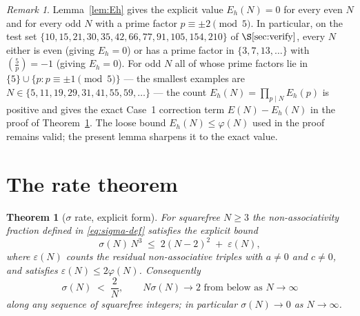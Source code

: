 \documentclass[11pt,reqno]{amsart}
\theoremstyle{plain}
\newtheorem{theorem}{Theorem}
\theoremstyle{definition}
\theoremstyle{remark}
\newtheorem*{remark}{Remark}
\begin{document}
\begin{remark}\label{rem:Eh-empirical}
Lemma~\ref{lem:Eh} gives the explicit value $E_{h}(N)=0$ for every
even $N$ and for every odd $N$ with a prime factor
$p\equiv\pm 2\pmod 5$. In particular, on the test set
$\{10,15,21,30,35,42,66,77,91,105,154,210\}$ of $\S\ref{sec:verify}$,
every $N$ either is even (giving $E_{h}=0$) or has a prime factor
in $\{3,7,13,\dots\}$ with $\left(\tfrac{5}{p}\right)=-1$ (giving
$E_{h}=0$). For odd $N$ all of whose prime factors lie in
$\{5\}\cup\{p:p\equiv\pm 1\pmod 5\}$ --- the smallest examples are
$N\in\{5,11,19,29,31,41,55,59,\dots\}$ --- the count
$E_{h}(N)=\prod_{p\mid N} E_{h}(p)$ is positive and gives the exact
Case~1 correction term $E(N)-E_{h}(N)$ in the proof of
Theorem~\ref{thm:rate}. The loose bound
$E_{h}(N)\le\varphi(N)$ used in the proof remains valid; the
present lemma sharpens it to the exact value.
\end{remark}

\section{The rate theorem}\label{sec:rate}

\begin{theorem}[$\sigma$ rate, explicit form]\label{thm:rate}
For squarefree $N\ge 3$ the non-associativity fraction defined in
\eqref{eq:sigma-def} satisfies the explicit bound
\begin{equation}\label{eq:rate}
  \sigma(N)\,N^{3}\;\le\;2(N-2)^{2}\;+\;\varepsilon(N),
\end{equation}
where $\varepsilon(N)$ counts the residual non-associative triples
with $a\neq 0$ \emph{and} $c\neq 0$, and satisfies
$\varepsilon(N)\le 2\varphi(N)$. Consequently
\begin{equation}\label{eq:rate-asymptotic}
  \sigma(N)\;<\;\frac{2}{N},
  \qquad N\sigma(N)\to 2 \text{ from below as } N\to\infty
\end{equation}
along any sequence of squarefree integers; in particular
$\sigma(N)\to 0$ as $N\to\infty$.
\end{theorem}
\end{document}
